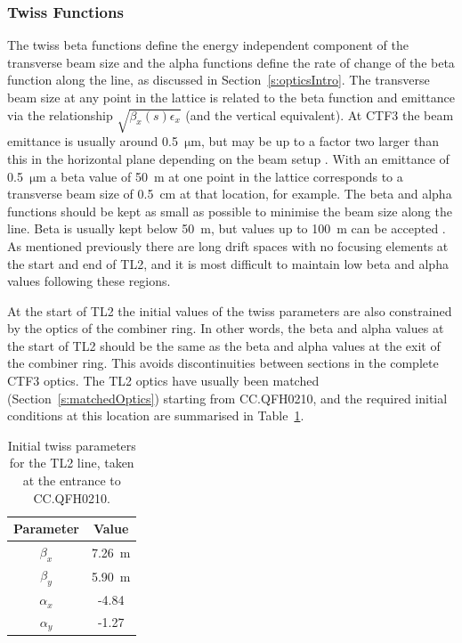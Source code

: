 \subsubsection{Twiss Functions}


The twiss beta functions define the energy independent component of the transverse beam size and the alpha functions define the rate of change of the beta function along the line, as discussed in Section~\ref{s:opticsIntro}. The transverse beam size at any point in the lattice is related to the beta function and emittance via the relationship \(\sqrt{\beta_x(s)\epsilon_x}\) (and the vertical equivalent). At CTF3 the beam emittance is usually around 0.5~\(\mathrm{\mu m}\), but may be up to a factor two larger than this in the horizontal plane depending on the beam setup \cite{davideThesis}. With an emittance of 0.5~\(\mathrm{\mu m}\) a beta value of 50~m at one point in the lattice corresponds to a transverse beam size of 0.5~cm at that location, for example. The beta and alpha functions should be kept as small as possible to minimise the beam size along the line. Beta is usually kept below 50~m, but values up to 100~m can be accepted \cite{piotrPriv}. As mentioned previously there are long drift spaces with no focusing elements at the start and end of TL2, and it is most difficult to maintain low beta and alpha values following these regions.

At the start of TL2 the initial values of the twiss parameters are also constrained by the optics of the combiner ring. In other words, the beta and alpha values at the start of TL2 should be the same as the beta and alpha values at the exit of the combiner ring. This avoids discontinuities between sections in the complete CTF3 optics. The TL2 optics have usually been matched (Section~\ref{s:matchedOptics}) starting from CC.QFH0210, and the required initial conditions at this location are summarised in Table~\ref{t:tl2InitTwiss}.

\begin{table}
  \begin{center}
    \begin{tabular}{|c c|}
	   \hline
       Parameter & Value \\
       \hline
       \(\beta_x\) & 7.26~m\\
	   \(\beta_y\) & 5.90~m\\
	   \(\alpha_x\) & -4.84\\
	   \(\alpha_y\) & -1.27\\
	   \hline
    \end{tabular}
    \caption{Initial twiss parameters for the TL2 line, taken at the entrance to CC.QFH0210.}
  	\label{t:tl2InitTwiss}
  \end{center}
\end{table}


